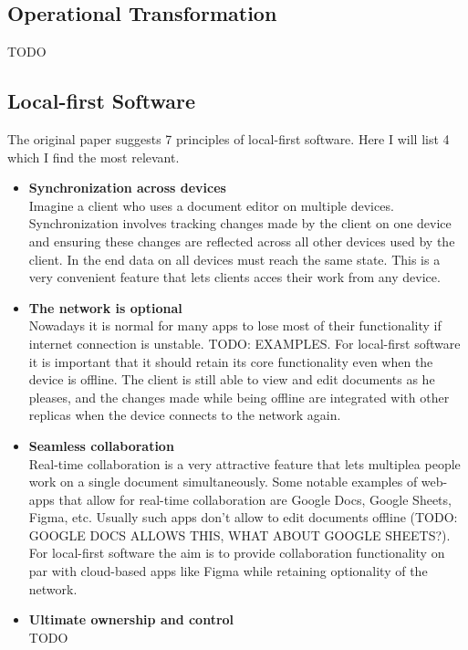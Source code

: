 \documentclass[a4paper, 11pt, oneside]{article}
\theoremstyle{definition}
\begin{document}
\subsection{Operational Transformation}
TODO
\subsection{Local-first Software}
The original paper \cite{localfirst} suggests 7 principles of local-first software. Here I will list 4 which I find the most relevant.
\begin{itemize}
    \item \textbf{Synchronization across devices} \\
    Imagine a client who uses a document editor on multiple devices. Synchronization involves tracking changes made by the client on one device and ensuring these changes are reflected across all other devices used by the client. In the end data on all devices must reach the same state. This is a very convenient feature that lets clients acces their work from any device.

    \item \textbf{The network is optional} \\
    Nowadays it is normal for many apps to lose most of their functionality if internet connection is unstable. TODO: EXAMPLES. For local-first software it is important that it should retain its core functionality even when the device is offline. The client is still able to view and edit documents as he pleases, and the changes made while being offline are integrated with other replicas when the device connects to the network again.

    \item \textbf{Seamless collaboration} \\
    Real-time collaboration is a very attractive feature that lets multiplea people work on a single document simultaneously. Some notable examples of web-apps that allow for real-time collaboration are Google Docs, Google Sheets, Figma, etc. Usually such apps don't allow to edit documents offline (TODO: GOOGLE DOCS ALLOWS THIS, WHAT ABOUT GOOGLE SHEETS?).  For local-first software the aim is to provide collaboration functionality on par with cloud-based apps like Figma while retaining optionality of the network.

    \item \textbf{Ultimate ownership and control} \\
    TODO
\end{itemize}
\end{document}
